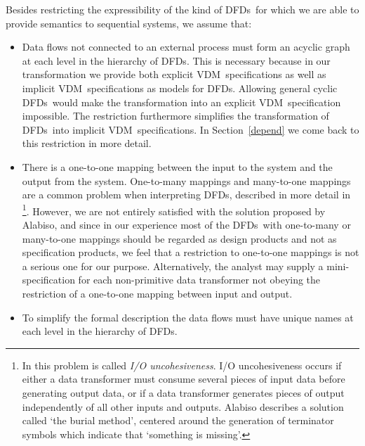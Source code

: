 \documentclass[11pt]{article}
\newcommand{\VDM}{{\small VDM}}
\newcommand{\DFDs}{{\small DFD}s}
\begin{document}
Besides restricting the expressibility of the kind of \DFDs\
for which we are able to provide semantics to sequential systems, we
assume that:

\begin{itemize}
\item Data flows not connected
      to an external process must form an acyclic
      graph at each level in the hierarchy of \DFDs. This
      is necessary because in our transformation we provide both
	  explicit \VDM\ specifications as well as implicit \VDM\ specifications
	  as models for \DFDs. Allowing general cyclic \DFDs\ would make the 
	  transformation into an explicit \VDM\ specification impossible.
	  The restriction furthermore simplifies the
      transformation of \DFDs\ into implicit \VDM\ specifications.
      In Section~\ref{depend} we come back to this restriction in more
	  detail.
\item There is a one-to-one mapping between the
      input to the system and the output from the system.
	  One-to-many mappings and many-to-one mappings are a common
	  problem when interpreting \DFDs, described in more detail
	  in \cite{Alabiso88}\footnote{%
      In \cite{Alabiso88} this problem is called {\em I/O uncohesiveness}.
      I/O uncohesiveness occurs if either a data transformer
      must consume several pieces of input data before generating
      output data, or if a data transformer generates pieces of output
      independently of all other inputs and outputs.
      Alabiso describes a solution called `the burial method',
	  centered around the generation of terminator symbols
      which indicate that `something is missing'.}.
	  However, we are not entirely satisfied with the solution proposed by
	  Alabiso, and since in our experience most of the \DFDs\ with
	  one-to-many or many-to-one mappings should be regarded as design
	  products and not as specification products, we feel that a
	  restriction to one-to-one mappings is not a serious one for our
	  purpose.
      Alternatively, the analyst may supply a mini-specification for 
      each non-primitive data transformer not obeying the restriction
	  of a one-to-one mapping between input and output.

\item To simplify the formal description the
data flows must have unique names at each level in the hierarchy
of \DFDs.
\end{itemize}



\newpage

 

\printindex
\end{document}
